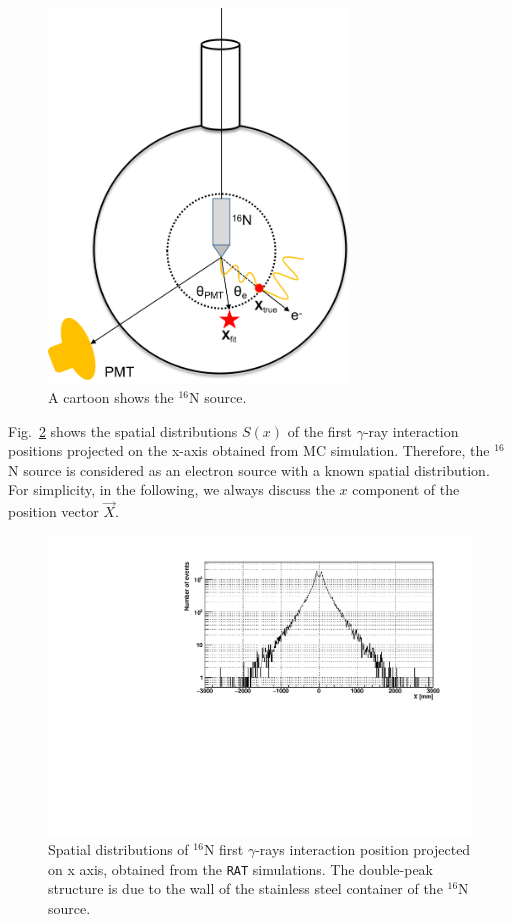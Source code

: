 \begin{figure}[!htb]
	\centering
	\includegraphics[width=8cm]{N16centralDiagram.png}
	\caption{A cartoon shows the $^{16}$N source.}
	\label{N16centralDiagram}
\end{figure}

Fig.~\ref{hsx} shows the spatial distributions $S(x)$ of the first $\gamma$-ray interaction positions projected on the x-axis obtained from MC simulation. Therefore, the $^{16}$N source is considered as an electron source with a known spatial distribution\cite{boulay2004direct}. For simplicity, in the following, we always discuss the $x$ component of the position vector $\vec{X}$. 

\begin{figure}[!htb]
	\centering
	\includegraphics[width=12cm]{sx.pdf}
	\caption{Spatial distributions of {$^{16}$}N first $\gamma$-rays interaction position projected on x axis, obtained from the \texttt{RAT} simulations. The double-peak structure is due to the wall of the stainless steel container of the $^{16}$N source.}
	\label{hsx}
\end{figure}

